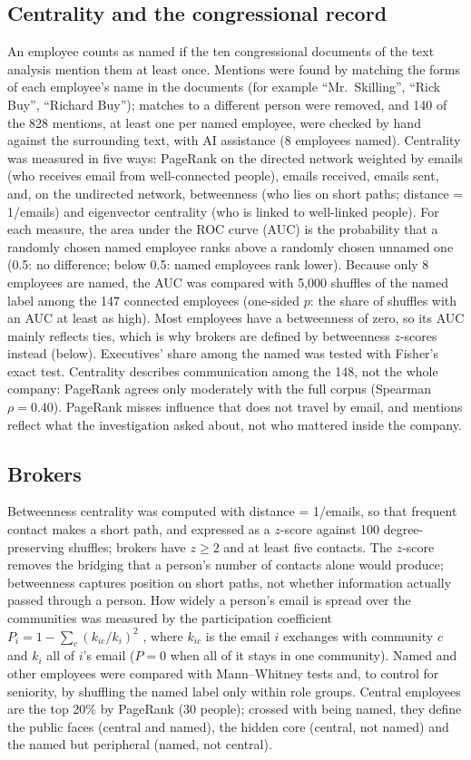 \documentclass[9pt,twocolumn,twoside]{pnas-new}
\begin{document}
\subsection*{Centrality and the congressional record}
An employee counts as named if the ten congressional documents of the text analysis mention
them at least once. Mentions were found by matching the forms of each employee's name in the
documents (for example ``Mr.~Skilling'', ``Rick Buy'', ``Richard Buy''); matches to a different
person were removed, and 140 of the 828 mentions, at least one per named employee, were
checked by hand against the surrounding text, with AI assistance (8 employees named). Centrality was measured in five
ways: PageRank \cite{brin1998} on the directed network weighted by emails (who receives email
from well-connected people), emails received, emails sent, and, on the undirected network,
betweenness \cite{freeman1977} (who lies on short paths; distance = 1/emails) and eigenvector
centrality (who is linked to well-linked people). For each measure, the area under the ROC curve (AUC) is the probability that a randomly
chosen named employee ranks above a randomly chosen unnamed one (0.5: no difference; below
0.5: named employees rank lower). Because only
8 employees are named, the AUC was compared with 5,000 shuffles of the named label among the
147 connected employees (one-sided $p$: the share of shuffles with an AUC at least as high).
Most employees have a betweenness of zero, so its AUC mainly reflects ties, which is why
brokers are defined by betweenness $z$-scores instead (below). Executives' share among the named was tested with Fisher's exact test. Centrality describes
communication among the 148, not the whole company: PageRank agrees only moderately with the
full corpus (Spearman $\rho = 0.40$). PageRank misses
influence that does not travel by email, and mentions reflect what the investigation asked
about, not who mattered inside the company.

\subsection*{Brokers}
Betweenness centrality \cite{freeman1977} was computed with distance = 1/emails, so that
frequent contact makes a short path, and expressed as a $z$-score against 100
degree-preserving shuffles; brokers have $z \ge 2$ and at least five contacts. The $z$-score
removes the bridging that a person's number of contacts alone would produce; betweenness
captures position on short paths, not whether information actually passed through a person.
How widely a person's email is spread over the communities was measured by the participation
coefficient $P_i = 1 - \sum_c (k_{ic}/k_i)^2$ \cite{guimera2005}, where $k_{ic}$ is the email
$i$ exchanges with community $c$ and $k_i$ all of $i$'s email ($P = 0$ when all of it stays in
one community). Named and other employees were compared with Mann--Whitney tests and, to
control for seniority, by shuffling the named label only within role groups. Central
employees are the top 20\% by PageRank (30 people); crossed with being named, they define
the public faces (central and named), the hidden core (central, not named) and the named but
peripheral (named, not central).
\end{document}

